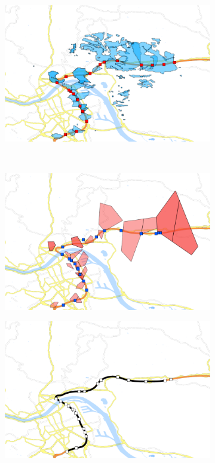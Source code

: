 \documentclass[master,english]{hgbthesis}
\begin{document}
\begin{figure}
	\centering
	\begin{subfigure}[b]{0.5\linewidth}
		\includegraphics[width=\textwidth]{./images/563_Coverage_Handover}
		\caption{}
		\label{fig:563coverage}
	\end{subfigure}%
	~
	\begin{subfigure}[b]{0.5\linewidth}
		\includegraphics[width=\textwidth]{./images/563_Voronoi_Handover}
		\caption{}
		\label{fig:563voronoi}
	\end{subfigure}
	\begin{subfigure}[b]{0.5\linewidth}
			\includegraphics[width=\textwidth]{./images/563_Handover}

\end{subfigure}
\end{figure}
\end{document}
